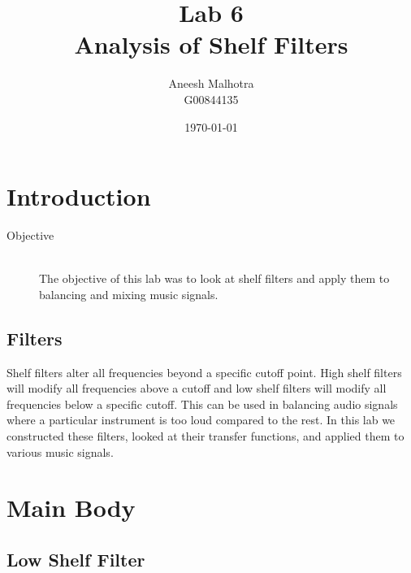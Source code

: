 \documentclass{article}
\title{Lab 6 \\ Analysis of Shelf Filters }%
\author{Aneesh Malhotra \\ G00844135} %
\date{\today} %
\begin{document}
\maketitle %




\section{Introduction}



\begin{description}
\item[Objective] \hfill \\
The objective of this lab was to look at shelf filters and apply them to balancing and mixing music signals.
\end{description}

\subsection{Filters}
Shelf filters alter all frequencies beyond a specific cutoff point. High shelf filters will modify all frequencies above a cutoff and low shelf filters will modify all frequencies below a specific cutoff. This can be used in balancing audio signals where a particular instrument is too loud compared to the rest. In this lab we constructed these filters, looked at their transfer functions, and applied them to various music signals.

\section{Main Body}

\subsection{Low Shelf Filter}
\end{document}
